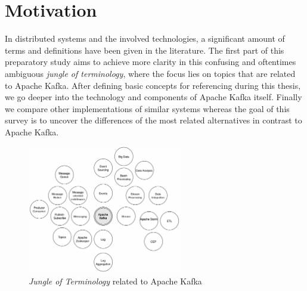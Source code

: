 \chapter{Motivation} 

In distributed systems and the involved technologies, a significant amount of
terms and definitions have been given in the literature. The first part of this
preparatory study aims to achieve more clarity in this confusing and oftentimes
ambiguous \textit{jungle of terminology}, where the focus lies on topics that
are related to Apache Kafka. After defining basic concepts for referencing
during this thesis, we go deeper into the technology and components of Apache
Kafka itself. Finally we compare other implementations of similar systems
whereas the goal of this survey is to uncover the differences of the most
related alternatives in contrast to Apache Kafka. \\

\begin{figure}[H]
    \centering
    \includegraphics[width=0.6\textwidth]{images/jungle-of-terminology.png}
    \caption{\textit{Jungle of Terminology} related to Apache Kafka}
    \label{fig:jungle-of-terminology}
\end{figure}

